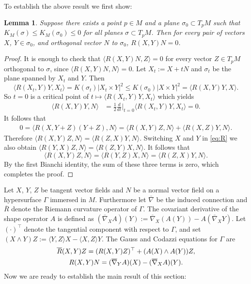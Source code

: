 \documentclass[11pt]{amsart}
\newtheorem{lemma}[theorem]{Lemma}
\theoremstyle{definition}
\newcommand{\ol}{\overline}
\begin{document}
 To establish the above result we first  show:


\begin{lemma}\label{lem:RXY}
Suppose there exists a point $p\in M$ and a plane $\sigma_0\subset T_pM$ such that $K_M(\sigma)\leq K_M(\sigma_0)\leq 0$ for all planes $\sigma\subset T_p M$.
 Then for every pair of vectors $X$, $Y\in\sigma_0$, and orthogonal vector $N$ to $\sigma_0$, $R(X,Y)N=0$.
\end{lemma}
\begin{proof}
It is enough to check that $\langle R(X,Y)N,Z\rangle=0$ for every vector $Z\in T_pM$ orthogonal to $\sigma$, since $\langle R(X,Y)N,N\rangle=0$.
Let $X_t:=X+t N$ and $\sigma_t$ be the plane spanned by $X_t$ and $Y$. Then
 $$
\langle R(X_t,Y)Y,X_t\rangle=K(\sigma_t) |X_t\times Y|^2 \leq K(\sigma_0) |X\times Y|^2 = \langle R(X,Y)Y,X\rangle.
$$ 
 So $t=0$ is a critical point of $t\mapsto \langle R(X_t,Y)Y,X_t\rangle$ which yields
\begin{align*}
\langle R(X,Y)Y,N\rangle&=\frac{1}{2}\frac{d}{d t}\Big|_{t=0}\langle R(X_t,Y)Y,X_t\rangle=0.
\end{align*}
It follows that
\begin{align}\label{eq:R}
0=\langle R(X,Y+Z)(Y+Z),N\rangle
=\langle R(X,Y)Z,N\rangle+\langle R(X,Z)Y,N\rangle.
\end{align}
Therefore
$\langle R(X,Y)Z,N\rangle=\langle R(Z,X)Y,N\rangle.$
Switching $X$ and $Y$ in \eqref{eq:R} we also obtain
$\langle R(Y,X)Z,N\rangle=\langle R(Z,Y)X,N\rangle.$
It follows that
\[\langle R(X,Y)Z,N\rangle=\langle R(Y,Z)X,N\rangle=\langle R(Z,X)Y,N\rangle.\]
By the first Bianchi identity, the sum of these three terms is zero, which completes the proof.
\end{proof}

Let $X$, $Y$, $Z$ be tangent vector fields and $N$ be a normal vector field on a hypersurface $\Gamma$ immersed in $M$.
Furthermore let $\ol\nabla$ be the induced connection and $\ol R$ denote the Riemann curvature operator of $\Gamma$. The  covariant derivative of the shape operator $A$ is defined as
$
(\ol\nabla_XA)(Y):=\ol\nabla_X(A(Y))-A(\ol\nabla_XY).
$
Let $(\cdot)^\top$ denote the tangential component with respect to $\Gamma$, and set
$
(X\wedge Y)Z:=\langle Y, Z\rangle X-\langle X, Z\rangle Y.
$
The Gauss and Codazzi equations \cite[p. 24]{dajczer1990} for $\Gamma$ are 
\begin{gather}\label{eq:gc}
\ol R(X,Y)Z=(R(X,Y)Z)^\top+(A(X)\wedge A(Y))Z,\\
R(X,Y)N=(\ol\nabla_YA)(X)-(\ol\nabla_XA)(Y).\notag
\end{gather}
Now we are ready to establish the main result of this section:
\end{document}
